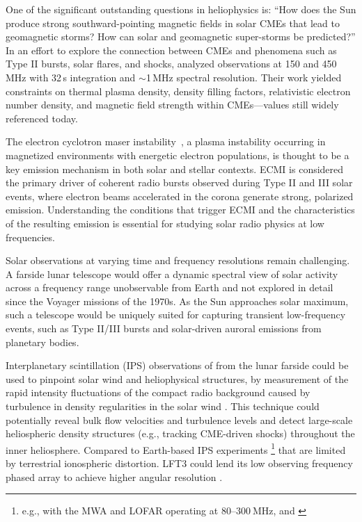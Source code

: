 One of the significant outstanding questions in heliophysics is: ``How does the Sun produce strong southward-pointing magnetic fields in solar CMEs that lead to geomagnetic storms? How can solar and geomagnetic super-storms be predicted?'' In an effort to explore the connection between CMEs and phenomena such as Type II bursts, solar flares, and shocks, \citet{Bastian_2001} analyzed observations at 150 and 450\,MHz with 32\,s integration and $\sim$1\,MHz spectral resolution. Their work yielded constraints on thermal plasma density, density filling factors, relativistic electron number density, and magnetic field strength within CMEs—values still widely referenced today.

The electron cyclotron maser instability~\citep[ECMI;][]{EMI}, a plasma instability occurring in magnetized environments with energetic electron populations, is thought to be a key emission mechanism in both solar and stellar contexts. ECMI is considered the primary driver of coherent radio bursts observed during Type II and III solar events, where electron beams accelerated in the corona generate strong, polarized emission. Understanding the conditions that trigger ECMI and the characteristics of the resulting emission is essential for studying solar radio physics at low frequencies.

Solar observations at varying time and frequency resolutions remain challenging. A farside lunar telescope would offer a dynamic spectral view of solar activity across a frequency range unobservable from Earth and not explored in detail since the Voyager missions of the 1970s. As the Sun approaches solar maximum, such a telescope would be uniquely suited for capturing transient low-frequency events, such as Type II/III bursts and solar-driven auroral emissions from planetary bodies. 



Interplanetary scintillation (IPS) observations of from the lunar farside could be used to pinpoint solar wind and heliophysical structures, by measurement of the rapid intensity fluctuations of the compact radio background caused by turbulence in density regularities in the solar wind \citep{fallows_application_2023}. This technique could potentially reveal bulk flow velocities and turbulence levels and detect large-scale heliospheric density structures (e.g., tracking CME-driven shocks) throughout the inner heliosphere. Compared to Earth-based IPS experiments \footnote{e.g., with the MWA and LOFAR operating at $80$–$300~\text{MHz}$, \cite{fallows_separating_2016} and \cite{kaplan_murchison_2015}} that are limited by terrestrial ionospheric distortion. LFT3 could lend its low observing frequency phased array to achieve higher angular resolution \citep{DEX}. 




